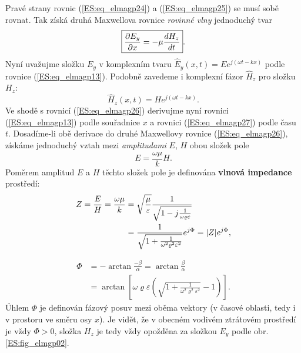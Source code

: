         Pravé strany rovnic (\ref{ES:eq_elmagp24}) a (\ref{ES:eq_elmagp25}) se musí sobě rovnat. 
        Tak získá druhá Maxwellova rovnice \emph{rovinné vlny} jednoduchý tvar
        \begin{equation}\label{ES:eq_elmagp26}
          \boxed{\dfrac{\partial E_y}{\partial x} = - \mu\dfrac{d H_z}{d t}}.
        \end{equation}
        Nyní uvažujme složku \(E_y\) v komplexním tvaru \(\hat{E}_y(x,t)=Ee^{j(\omega t - kx)}\)  
        podle rovnice (\ref{ES:eq_elmagp13}). Podobně zavedeme i komplexní fázor \(\hat{H}_z\) pro 
        složku \(H_z\):
        \begin{equation}\label{ES:eq_elmagp27}
          \hat{H}_z(x,t)=H e^{j(\omega t - kx)}.
        \end{equation}
        Ve shodě s rovnicí (\ref{ES:eq_elmagp26}) derivujme nyní rovnici (\ref{ES:eq_elmagp13}) 
        podle souřadnice \(x\) a rovnici (\ref{ES:eq_elmagp27}) podle času \(t\). Dosadíme-li obě 
        derivace do druhé Maxwellovy rovnice (\ref{ES:eq_elmagp26}), získáme jednoduchý vztah mezi 
        \emph{amplitudami} \(E\), \(H\) obou složek pole
        \begin{equation}\label{ES:eq_elmagp28}
          E = \frac{\omega\mu}{k}H.
        \end{equation}
        Poměrem amplitud \(E\) a \(H\) těchto složek pole je definována \textbf{vlnová impedance} 
        prostředí:
        \begin{align} \label{ES:eq_elmagp29}
          Z  = \frac{E}{H} = \frac{\omega\mu}{k}
            &= \sqrt{\dfrac{\mu}{\varepsilon}}
               \frac{1}{\sqrt{1-j\frac{1}{\omega\varrho\varepsilon}}}                 \nonumber \\
            &= \frac{1}{\sqrt{1+\frac{1}{\omega^2\varrho^2\varepsilon^2}}}e^{j\Phi}
             = \lvert Z\rvert e^{j\Phi},
        \end{align}

        \begin{align}\label{ES:eq_elmagp32}
          \Phi &= -\arctan\frac{-\beta}{\alpha} = \arctan\frac{\beta}{\alpha}         \nonumber \\
               &=  \arctan\left[
                            \omega\varrho\varepsilon
                              \left(\sqrt{1+
                                 \frac{1}{\omega^2\varrho^2\varepsilon^2}}-1
                              \right)
                          \right].
        \end{align}
        Úhlem \(\Phi\) je definován fázový posuv mezi oběma vektory (v časové oblasti, tedy i v 
        prostoru ve směru osy \(x\)). Je vidět, že v obecném vodivém ztrátovém prostředí je vždy 
        \(\Phi>0\), složka \(H_z\) je tedy vždy opožděna za složkou \(E_y\) podle obr. 
        \ref{ES:fig_elmgp02}.
        
